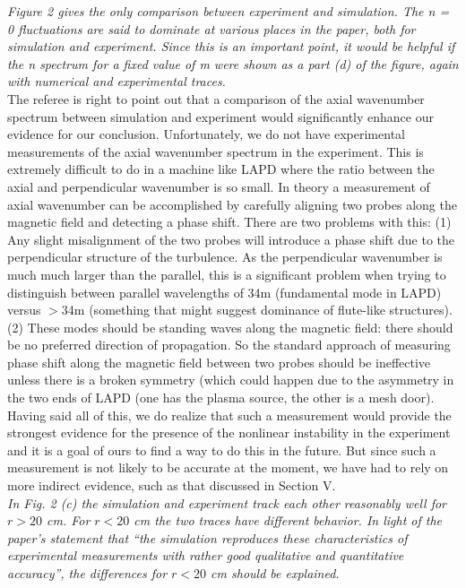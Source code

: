 \documentclass[12pt]{article}
\begin{document}
{\noindent \itshape   Figure 2 gives the only comparison between experiment and simulation. The n = 0
fluctuations are said to dominate at various places in the paper, both for simulation and
experiment. Since this is an important point, it would be helpful if the n spectrum for a
fixed value of m were shown as a part (d) of the figure, again with numerical and
experimental traces. }\\

{\noindent The referee is right to point out that a comparison of the axial wavenumber spectrum between simulation and experiment would significantly enhance our evidence for our conclusion.  Unfortunately, we do not have experimental measurements of the axial wavenumber spectrum in the experiment. This is extremely difficult to do in a machine like LAPD where the ratio between the axial and perpendicular wavenumber is so small.  In theory a measurement of axial wavenumber can be accomplished by carefully aligning two probes along the magnetic field and detecting a phase shift.  There are two problems with this: (1) Any slight misalignment of the two probes will introduce a phase shift due to the perpendicular structure of the turbulence.  As the perpendicular wavenumber is much much larger than the parallel, this is a significant problem when trying to distinguish between parallel wavelengths of 34m (fundamental mode in LAPD) versus $>$34m (something that might suggest dominance of flute-like structures).  (2) These modes should be standing waves along the magnetic field:  there should be no preferred direction of propagation.  So the standard approach of measuring phase shift along the magnetic field between two probes should be ineffective unless there is a broken symmetry (which could happen due to the asymmetry in the two ends of LAPD (one has the plasma source, the other is a mesh door).  Having said all of this, we do realize that such a measurement would provide the strongest
evidence for the presence of the nonlinear instability in the experiment and it is a goal of ours to find a way to do this in the future. 
But since such a measurement is not likely to be accurate at the moment, we have had to rely on more indirect evidence, such as that discussed in Section V. }\\
   

{\noindent \itshape In Fig. 2 (c) the simulation and experiment track each other reasonably well for $r > 20$
cm. For $r < 20$ cm the two traces have different behavior. In light of the paper’s
statement that “the simulation reproduces these characteristics of experimental
measurements with rather good qualitative and quantitative accuracy”, the differences for
$r < 20$ cm should be explained. }\\
\end{document}
